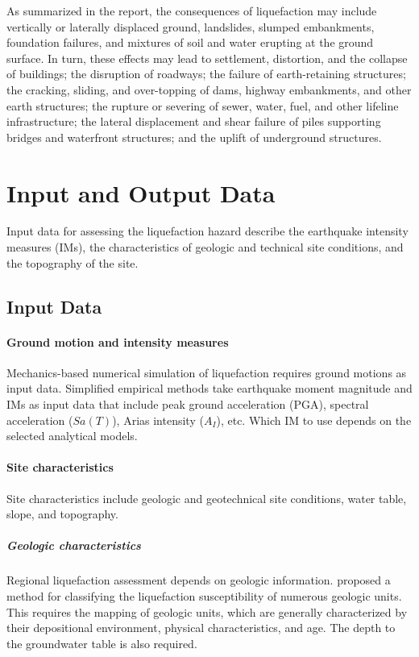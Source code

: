 As summarized in the \citet{national2016state} report, the consequences of liquefaction may include vertically or laterally displaced ground, landslides, slumped embankments, foundation failures, and mixtures of soil and water erupting at the ground surface. In turn, these effects may lead to settlement, distortion, and the collapse of buildings; the disruption of roadways; the failure of earth-retaining structures; the cracking, sliding, and over-topping of dams, highway embankments, and other earth structures; the rupture or severing of sewer, water, fuel, and other lifeline infrastructure; the lateral displacement and shear failure of piles supporting bridges and waterfront structures; and the uplift of underground structures.

\section{Input and Output Data}

Input data for assessing the liquefaction hazard describe the earthquake intensity measures (IMs), the characteristics of geologic and technical site conditions, and the topography of the site.

\subsection{Input Data}
\label{subsec:eq_liquefaction_input}

\paragraph{Ground motion and intensity measures}
Mechanics-based numerical simulation of liquefaction requires ground motions as input data. Simplified empirical methods take earthquake moment magnitude and IMs as input data that include peak ground acceleration (PGA), spectral acceleration ($Sa(T)$), Arias intensity ($A_I$), etc. Which IM to use depends on the selected analytical models.


\paragraph{Site characteristics}
Site characteristics include geologic and geotechnical site conditions, water table, slope, and topography.

\subparagraph{Geologic characteristics}
Regional liquefaction assessment depends on geologic information. \citet{youd1987mapping}  proposed a method for classifying the liquefaction susceptibility of numerous geologic units. This requires the mapping of geologic units, which are generally characterized by their depositional environment, physical characteristics, and age. The depth to the groundwater table is also required.

